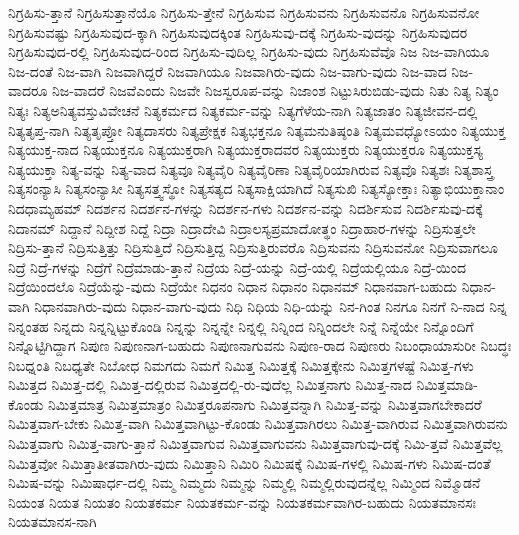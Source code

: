 {ನಿಗ್ರಹಿಸು-ತ್ತಾನೆ
ನಿಗ್ರಹಿಸುತ್ತಾನೆಯೊ
ನಿಗ್ರಹಿಸು-ತ್ತೇನೆ
ನಿಗ್ರಹಿಸುವ
ನಿಗ್ರಹಿಸುವನು
ನಿಗ್ರಹಿಸುವನೊ
ನಿಗ್ರಹಿಸುವನೋ
ನಿಗ್ರಹಿಸುವಷ್ಟು
ನಿಗ್ರಹಿಸುವುದ-ಕ್ಕಾಗಿ
ನಿಗ್ರಹಿಸುವುದಕ್ಕಿಂತ
ನಿಗ್ರಹಿಸುವು-ದಕ್ಕೆ
ನಿಗ್ರಹಿಸು-ವುದನ್ನು
ನಿಗ್ರಹಿಸುವುದರ
ನಿಗ್ರಹಿಸುವುದ-ರಲ್ಲಿ
ನಿಗ್ರಹಿಸುವುದ-ರಿಂದ
ನಿಗ್ರಹಿಸು-ವುದಿಲ್ಲ
ನಿಗ್ರಹಿಸು-ವುದು
ನಿಗ್ರಹಿಸುವೆವೊ
ನಿಜ
ನಿಜ-ವಾಗಿಯೂ
ನಿಜ-ದಂತೆ
ನಿಜ-ವಾಗಿ
ನಿಜವಾಗಿದ್ದರೆ
ನಿಜವಾಗಿಯೂ
ನಿಜವಾಗಿರು-ವುದು
ನಿಜ-ವಾಗು-ವುದು
ನಿಜ-ವಾದ
ನಿಜ-ವಾದರೂ
ನಿಜ-ವಾದರೆ
ನಿಜವೆಎಂದು
ನಿಜವೇ
ನಿಜಸ್ವರೂಪ-ವನ್ನು
ನಿಜಾಂಶ
ನಿಟ್ಟುಸಿರುಬಿಡು-ವುದು
ನಿತು
ನಿತ್ಯ
ನಿತ್ಯಂ
ನಿತ್ಯಃ
ನಿತ್ಯಅನಿತ್ಯವಸ್ತುವಿವೇಚನೆ
ನಿತ್ಯಕರ್ಮದ
ನಿತ್ಯಕರ್ಮ-ವನ್ನು
ನಿತ್ಯಗೆಳೆಯ-ನಾಗಿ
ನಿತ್ಯಜಾತಂ
ನಿತ್ಯಜೀವನ-ದಲ್ಲಿ
ನಿತ್ಯತೃಪ್ತ-ನಾಗಿ
ನಿತ್ಯತೃಪ್ತೋ
ನಿತ್ಯದಾಸರು
ನಿತ್ಯಪ್ರೇಕ್ಷಕ
ನಿತ್ಯಭಕ್ತನೂ
ನಿತ್ಯಮನುತಿಷ್ಠಂತಿ
ನಿತ್ಯಮವಧ್ಯೋಽಯಂ
ನಿತ್ಯಯುಕ್ತ
ನಿತ್ಯಯುಕ್ತ-ನಾದ
ನಿತ್ಯಯುಕ್ತನೂ
ನಿತ್ಯಯುಕ್ತರಾಗಿ
ನಿತ್ಯಯುಕ್ತರಾದವರ
ನಿತ್ಯಯುಕ್ತರು
ನಿತ್ಯಯುಕ್ತರೂ
ನಿತ್ಯಯುಕ್ತಸ್ಯ
ನಿತ್ಯಯುಕ್ತಾ
ನಿತ್ಯ-ವನ್ನು
ನಿತ್ಯ-ವಾದ
ನಿತ್ಯವೂ
ನಿತ್ಯವೈರಿ
ನಿತ್ಯವೈರಿಣಾ
ನಿತ್ಯವೈರಿಯಾಗಿರುವ
ನಿತ್ಯವೊ
ನಿತ್ಯಶಃ
ನಿತ್ಯಶಾಸ್ತ್ರ
ನಿತ್ಯಸಂನ್ಯಾಸಿ
ನಿತ್ಯಸಂನ್ಯಾಸೀ
ನಿತ್ಯಸತ್ತ್ವಸ್ಥೋ
ನಿತ್ಯಸತ್ಯದ
ನಿತ್ಯಸಾಕ್ಷಿಯಾಗಿದೆ
ನಿತ್ಯಸುಖಿ
ನಿತ್ಯಸ್ಯೋಕ್ತಾಃ
ನಿತ್ಯಾಭಿಯುಕ್ತಾನಾಂ
ನಿದಧಾಮ್ಯಹಮ್
ನಿದರ್ಶನ
ನಿದರ್ಶನ-ಗಳನ್ನು
ನಿದರ್ಶನ-ಗಳು
ನಿದರ್ಶನ-ವನ್ನು
ನಿದರ್ಶಿಸುವ
ನಿದರ್ಶಿಸುವು-ದಕ್ಕೆ
ನಿದಾನಮ್
ನಿದ್ದಾನೆ
ನಿದ್ದೀಶ
ನಿದ್ದೆ
ನಿದ್ರಾ
ನಿದ್ರಾದೇವಿ
ನಿದ್ರಾಲಸ್ಯಪ್ರಮಾದೋತ್ಥಂ
ನಿದ್ರಾಹಾರ-ಗಳನ್ನು
ನಿದ್ರಿಸುತ್ತಲೇ
ನಿದ್ರಿಸು-ತ್ತಾನೆ
ನಿದ್ರಿಸುತ್ತಿತ್ತು
ನಿದ್ರಿಸುತ್ತಿದೆ
ನಿದ್ರಿಸುತ್ತಿದ್ದ
ನಿದ್ರಿಸುತ್ತಿರುವರೊ
ನಿದ್ರಿಸುವನು
ನಿದ್ರಿಸುವನೋ
ನಿದ್ರಿಸುವಾಗಲೂ
ನಿದ್ರೆ
ನಿದ್ರೆ-ಗಳನ್ನು
ನಿದ್ರೆಗೆ
ನಿದ್ರೆಮಾಡು-ತ್ತಾನೆ
ನಿದ್ರೆಯ
ನಿದ್ರೆ-ಯನ್ನು
ನಿದ್ರೆ-ಯಲ್ಲಿ
ನಿದ್ರೆಯಲ್ಲಿಯೂ
ನಿದ್ರೆ-ಯಿಂದ
ನಿದ್ರೆಯಿಂದಲೊ
ನಿದ್ರೆಯೆನ್ನು-ವುದು
ನಿದ್ರೆಯೇ
ನಿಧನಂ
ನಿಧಾನ
ನಿಧಾನಂ
ನಿಧಾನಮ್
ನಿಧಾನವಾಗ-ಬಹುದು
ನಿಧಾನ-ವಾಗಿ
ನಿಧಾನವಾಗಿರು-ವುದು
ನಿಧಾನ-ವಾಗು-ವುದು
ನಿಧಿ
ನಿಧಿಯ
ನಿಧಿ-ಯನ್ನು
ನಿನ-ಗಿಂತ
ನಿನಗೂ
ನಿನಗೆ
ನಿ-ನಾದ
ನಿನ್ನ
ನಿನ್ನಂತಹ
ನಿನ್ನದು
ನಿನ್ನನ್ನಿಟ್ಟುಕೊಂಡಿ
ನಿನ್ನನ್ನು
ನಿನ್ನನ್ನೇ
ನಿನ್ನಲ್ಲಿ
ನಿನ್ನಿಂದ
ನಿನ್ನಿಂದಲೇ
ನಿನ್ನೆ
ನಿನ್ನೆಯೇ
ನಿನ್ನೊಂದಿಗೆ
ನಿನ್ನೊಟ್ಟಿಗಿದ್ದಾಗ
ನಿಪುಣ
ನಿಪುಣನಾಗ-ಬಹುದು
ನಿಪುಣನಾಗುವನು
ನಿಪುಣ-ರಾದ
ನಿಪುಣರು
ನಿಬಂಧಾಯಾಸುರೀ
ನಿಬದ್ಧಃ
ನಿಬಧ್ನಂತಿ
ನಿಬಧ್ಯತೇ
ನಿಬೋಧ
ನಿಮಗದು
ನಿಮಗೆ
ನಿಮಿತ್ತ
ನಿಮಿತ್ತಕ್ಕೆ
ನಿಮಿತ್ತಕ್ಕೇನು
ನಿಮಿತ್ತಗಳಷ್ಟೆ
ನಿಮಿತ್ತ-ಗಳು
ನಿಮಿತ್ತದ
ನಿಮಿತ್ತ-ದಲ್ಲಿ
ನಿಮಿತ್ತ-ದಲ್ಲಿರುವ
ನಿಮಿತ್ತದಲ್ಲಿ-ರು-ವುದೆಲ್ಲ
ನಿಮಿತ್ತನಾಗು
ನಿಮಿತ್ತ-ನಾದ
ನಿಮಿತ್ತಮಾಡಿ-ಕೊಂಡು
ನಿಮಿತ್ತಮಾತ್ರ
ನಿಮಿತ್ತಮಾತ್ರಂ
ನಿಮಿತ್ತರೂಪನಾಗು
ನಿಮಿತ್ತವನ್ನಾಗಿ
ನಿಮಿತ್ತ-ವನ್ನು
ನಿಮಿತ್ತವಾಗಬೇಕಾದರೆ
ನಿಮಿತ್ತವಾಗ-ಬೇಕು
ನಿಮಿತ್ತ-ವಾಗಿ
ನಿಮಿತ್ತವಾಗಿಟ್ಟು-ಕೊಂಡು
ನಿಮಿತ್ತವಾಗಿರಲು
ನಿಮಿತ್ತ-ವಾಗಿರುವ
ನಿಮಿತ್ತವಾಗಿರುವನು
ನಿಮಿತ್ತವಾಗು
ನಿಮಿತ್ತ-ವಾಗು-ತ್ತಾನೆ
ನಿಮಿತ್ತವಾಗುವ
ನಿಮಿತ್ತವಾಗುವನು
ನಿಮಿತ್ತವಾಗುವು-ದಕ್ಕೆ
ನಿಮಿ-ತ್ತವೆ
ನಿಮಿತ್ತವೆಲ್ಲ
ನಿಮಿತ್ತವೋ
ನಿಮಿತ್ತಾತೀತವಾಗಿರು-ವುದು
ನಿಮಿತ್ತಾನಿ
ನಿಮಿರಿ
ನಿಮಿಷಕ್ಕೆ
ನಿಮಿಷ-ಗಳಲ್ಲಿ
ನಿಮಿಷ-ಗಳು
ನಿಮಿಷ-ದಂತೆ
ನಿಮಿಷ-ವನ್ನು
ನಿಮಿಷಾರ್ಧ-ದಲ್ಲಿ
ನಿಮ್ಮ
ನಿಮ್ಮದು
ನಿಮ್ಮನ್ನು
ನಿಮ್ಮಲ್ಲಿ
ನಿಮ್ಮಲ್ಲಿರುವುದನ್ನೆಲ್ಲ
ನಿಮ್ಮಿಂದ
ನಿಮ್ಮೊಡನೆ
ನಿಯಂತ
ನಿಯತ
ನಿಯತಂ
ನಿಯತಕರ್ಮ
ನಿಯತಕರ್ಮ-ವನ್ನು
ನಿಯತಕರ್ಮವಾಗಿರ-ಬಹುದು
ನಿಯತಮಾನಸಃ
ನಿಯತಮಾನಸ-ನಾಗಿ
}
